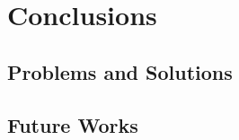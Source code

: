 \documentclass[12pt,oneside,openright,a4paper]{explo-english-project}
\begin{document}

\chapter{Conclusions}

\section{Problems and Solutions}


\section{Future Works}









\end{document}
